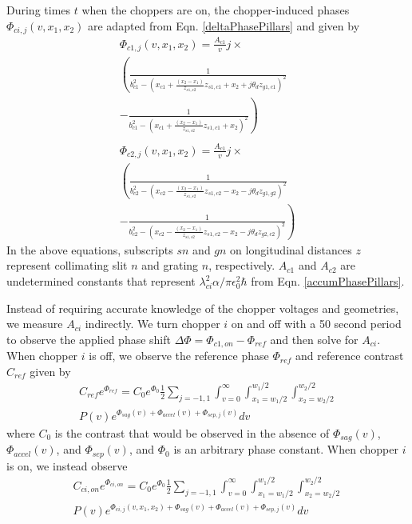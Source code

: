 \documentclass[twocolumn,prl,showpacs,superscriptaddress]{revtex4-1}   %
\newcommand{\eqnref}[1]{Eqn. \eqref{#1}}
\begin{document}
During times $t$ when the choppers are on, the chopper-induced phases $\Phi_{ci,j}(v,x_1,x_2)$ are adapted from \eqnref{deltaPhasePillars} and given by
\begin{align}
	\Phi_{c1,j}(v,x_1,x_2) = \frac{A_{c1}}{v}j \times \nonumber \\
	\left(
		\frac{1}{b_{c1}^2 -
			(x_{c1} + \frac{(x_2-x_1)}{z_{s1,s2}}z_{s1,c1} + x_2 + j\theta_d z_{g1,c1})^2
		}
		\right. \nonumber \\ - \left.
		\frac{1}{b_{c1}^2 -
			(x_{c1} + \frac{(x_2-x_1)}{z_{s1,s2}}z_{s1,c1} + x_2)^2
		}
	\right)
	\nonumber \\ 
	\nonumber \\	
	\Phi_{c2,j}(v,x_1,x_2) = \frac{A_{c1}}{v}j \times \nonumber \\
	\left(
		\frac{1}{b_{c2}^2 -
			(x_{c2} - \frac{(x_2-x_1)}{z_{s1,s2}}z_{s1,c2} - x_2 - j\theta_d z_{g1,g2})^2
		}
		\right. \nonumber \\ - \left.
		\frac{1}{b_{c2}^2 -
			(x_{c2} - \frac{(x_2-x_1)}{z_{s1,s2}}z_{s1,c2} - x_2 - j\theta_d z_{g2,c2})^2
		}
	\right)
	\label{phic1c2}
\end{align}
In the above equations, subscripts $sn$ and $gn$ on longitudinal distances $z$ represent collimating slit $n$ and grating $n$, respectively. $A_{c1}$ and $A_{c2}$ are undetermined constants that represent $\lambda_{ci}^2 \alpha / \pi \epsilon_0^2 \hbar$ from \eqnref{accumPhasePillars}. 

Instead of requiring accurate knowledge of the chopper voltages and geometries, we measure $A_{ci}$ indirectly. We turn chopper $i$ on and off with a 50 second period to observe the applied phase shift $\Delta\Phi = \Phi_{c1,on} - \Phi_{ref}$ and then solve for $A_{ci}$. When chopper $i$ is off, we observe the reference phase $\Phi_{ref}$ and reference contrast $C_{ref}$ given by 
\begin{align}
	C_{ref}e^{\Phi_{ref}} = 
		C_0e^{\Phi_0} \frac{1}{2} \sum_{j=-1,1}
		\int_{v=0}^{\infty}
		\int_{x_1=w_1/2}^{w_1/2}
		\int_{x_2=w_2/2}^{w_2/2} 
		\nonumber \\
		P(v) e^{\Phi_{sag}(v) + \Phi_{accel}(v) + \Phi_{sep,j}(v)} 
		dv
	\label{CPChoppersRef}
\end{align}
where $C_0$ is the contrast that would be observed in the absence of $\Phi_{sag}(v)$, $\Phi_{accel}(v)$, and $\Phi_{sep}(v)$, and $\Phi_0$ is an arbitrary phase constant. When chopper $i$ is on, we instead observe
\begin{align}
	C_{ci,on}e^{\Phi_{ci,on}} = 
		C_0e^{\Phi_0} \frac{1}{2} \sum_{j=-1,1}
		\int_{v=0}^{\infty}
		\int_{x_1=w_1/2}^{w_1/2}
		\int_{x_2=w_2/2}^{w_2/2} 
		\nonumber \\
		P(v) e^{\Phi_{ci,j}(v,x_1,x_2) + \Phi_{sag}(v) + \Phi_{accel}(v) + \Phi_{sep,j}(v)} 
		dv
	\label{CPChoppersOn}
\end{align}
\end{document}
